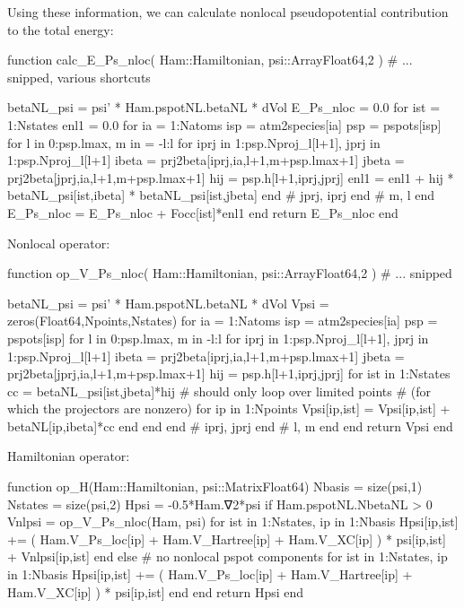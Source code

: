 Using these information, we can calculate nonlocal pseudopotential
contribution to the total energy:
\begin{juliacode}
function calc_E_Ps_nloc( Ham::Hamiltonian, psi::Array{Float64,2} )
    # ... snipped, various shortcuts

    betaNL_psi = psi' * Ham.pspotNL.betaNL * dVol
    E_Ps_nloc = 0.0
    for ist = 1:Nstates
        enl1 = 0.0
        for ia = 1:Natoms
            isp = atm2species[ia]
            psp = pspots[isp]
            for l in 0:psp.lmax, m in = -l:l
                for iprj in 1:psp.Nproj_l[l+1], jprj in 1:psp.Nproj_l[l+1]
                    ibeta = prj2beta[iprj,ia,l+1,m+psp.lmax+1]
                    jbeta = prj2beta[jprj,ia,l+1,m+psp.lmax+1]
                    hij = psp.h[l+1,iprj,jprj]
                    enl1 = enl1 + hij * betaNL_psi[ist,ibeta] * betaNL_psi[ist,jbeta]
                end # jprj, iprj
            end # m, l
        end
        E_Ps_nloc = E_Ps_nloc + Focc[ist]*enl1
    end
    return E_Ps_nloc
end
\end{juliacode}

Nonlocal operator:
\begin{juliacode}
function op_V_Ps_nloc( Ham::Hamiltonian, psi::Array{Float64,2} )
  # ... snipped

    betaNL_psi = psi' * Ham.pspotNL.betaNL * dVol
    Vpsi = zeros(Float64,Npoints,Nstates)
    for ia = 1:Natoms
        isp = atm2species[ia]
        psp = pspots[isp]
        for l in 0:psp.lmax, m in -l:l
            for iprj in 1:psp.Nproj_l[l+1], jprj in 1:psp.Nproj_l[l+1]
                ibeta = prj2beta[iprj,ia,l+1,m+psp.lmax+1]
                jbeta = prj2beta[jprj,ia,l+1,m+psp.lmax+1]
                hij = psp.h[l+1,iprj,jprj]
                for ist in 1:Nstates
                    cc = betaNL_psi[ist,jbeta]*hij
                    # should only loop over limited points
                    # (for which the projectors are nonzero)
                    for ip in 1:Npoints
                        Vpsi[ip,ist] = Vpsi[ip,ist] + betaNL[ip,ibeta]*cc
                    end
                end
            end # iprj, jprj
        end # l, m
    end
  end
  return Vpsi
end
\end{juliacode}

Hamiltonian operator:
\begin{juliacode}
function op_H(Ham::Hamiltonian, psi::Matrix{Float64})
    Nbasis = size(psi,1)
    Nstates = size(psi,2)
    Hpsi = -0.5*Ham.∇2*psi
    if Ham.pspotNL.NbetaNL > 0
        Vnlpsi = op_V_Ps_nloc(Ham, psi)
        for ist in 1:Nstates, ip in 1:Nbasis
            Hpsi[ip,ist] += ( Ham.V_Ps_loc[ip] +
              Ham.V_Hartree[ip] + Ham.V_XC[ip] ) * psi[ip,ist] + Vnlpsi[ip,ist]
        end
    else # no nonlocal pspot components
        for ist in 1:Nstates, ip in 1:Nbasis
            Hpsi[ip,ist] += ( Ham.V_Ps_loc[ip] +
              Ham.V_Hartree[ip] + Ham.V_XC[ip] ) * psi[ip,ist]
        end
    end
    return Hpsi
end
\end{juliacode}


